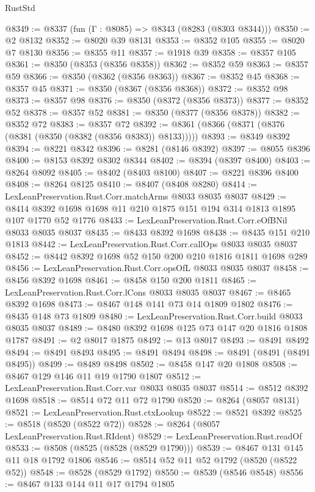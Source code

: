 \begin{lexlean}{RustStd}
\begin{coremodule}
{\begin{coremodule}
{{{{{{{{{{{{{{{{{{{{{{{{{{{{{{{{{{{{{{{{{{{{{{{@8349 := @8337 (fun (Γ : @8085) => @8343 (@8283 (@8303 @8344)))
@8350 := @2 @8132
@8352 := @8020 @39 @8131
@8353 := @8352 @105
@8355 := @8020 @7 @8130
@8356 := @8355 @11
@8357 := @1918 @39
@8358 := @8357 @105
@8361 := @8350 (@8353 (@8356 @8358))
@8362 := @8352 @59
@8363 := @8357 @59
@8366 := @8350 (@8362 (@8356 @8363))
@8367 := @8352 @45
@8368 := @8357 @45
@8371 := @8350 (@8367 (@8356 @8368))
@8372 := @8352 @98
@8373 := @8357 @98
@8376 := @8350 (@8372 (@8356 @8373))
@8377 := @8352 @52
@8378 := @8357 @52
@8381 := @8350 (@8377 (@8356 @8378))
@8382 := @8352 @72
@8383 := @8357 @72
@8392 := @8361 (@8366 (@8371 (@8376 (@8381 (@8350 (@8382 (@8356 @8383)) @8133)))))
@8393 := @8349 @8392
@8394 := @8221 @8342
@8396 := @8281 (@8146 @8392)
@8397 := @8055 @8396
@8400 := @8153 @8392 @8302 @8344
@8402 := @8394 (@8397 @8400)
@8403 := @8264 @8092
@8405 := @8402 (@8403 @8100)
@8407 := @8221 @8396 @8400
@8408 := @8264 @8125
@8410 := @8407 (@8408 @8280)
@8414 := LexLeanPreservation.Rust.Corr.matchArms @8033 @8035 @8037
@8429 := @8414 @8392 @1698 @1698 @11 @210 @1875 @151 @194 @314 @1813 @1895 @107 @1770 @52 @1776
@8433 := LexLeanPreservation.Rust.Corr.eOfBNil @8033 @8035 @8037
@8435 := @8433 @8392 @1698
@8438 := @8435 @151 @210 @1813
@8442 := LexLeanPreservation.Rust.Corr.callOps @8033 @8035 @8037
@8452 := @8442 @8392 @1698 @52 @150 @200 @210 @1816 @1811 @1698 @289
@8456 := LexLeanPreservation.Rust.Corr.opsOfL @8033 @8035 @8037
@8458 := @8456 @8392 @1698
@8461 := @8458 @150 @200 @1811
@8465 := LexLeanPreservation.Rust.Corr.lCons @8033 @8035 @8037
@8467 := @8465 @8392 @1698
@8473 := @8467 @148 @141 @73 @14 @1809 @1802
@8476 := @8435 @148 @73 @1809
@8480 := LexLeanPreservation.Rust.Corr.build @8033 @8035 @8037
@8489 := @8480 @8392 @1698 @125 @73 @147 @20 @1816 @1808 @1787
@8491 := @2 @8017 @1875
@8492 := @13 @8017
@8493 := @8491 @8492
@8494 := @8491 @8493
@8495 := @8491 @8494
@8498 := @8491 (@8491 (@8491 @8495))
@8499 := @8489 @8498
@8502 := @8458 @147 @20 @1808
@8508 := @8467 @129 @146 @11 @19 @1790 @1807
@8512 := LexLeanPreservation.Rust.Corr.var @8033 @8035 @8037
@8514 := @8512 @8392 @1698
@8518 := @8514 @72 @11 @72 @1790
@8520 := @8264 (@8057 @8131)
@8521 := LexLeanPreservation.Rust.ctxLookup
@8522 := @8521 @8392
@8525 := @8518 (@8520 (@8522 @72))
@8528 := @8264 (@8057 LexLeanPreservation.Rust.RIdent)
@8529 := LexLeanPreservation.Rust.readOf
@8533 := @8508 (@8525 (@8528 (@8529 @1790)))
@8539 := @8467 @131 @145 @11 @18 @1792 @1806
@8546 := @8514 @52 @11 @52 @1792 (@8520 (@8522 @52))
@8548 := @8528 (@8529 @1792)
@8550 := @8539 (@8546 @8548)
@8556 := @8467 @133 @144 @11 @17 @1794 @1805
}}}}}}}}}}}}}}}}}}}}}}}}}}}}}}}}}}}}}}}}}}}}}}}
\end{coremodule}}
\end{coremodule}
\end{lexlean}
